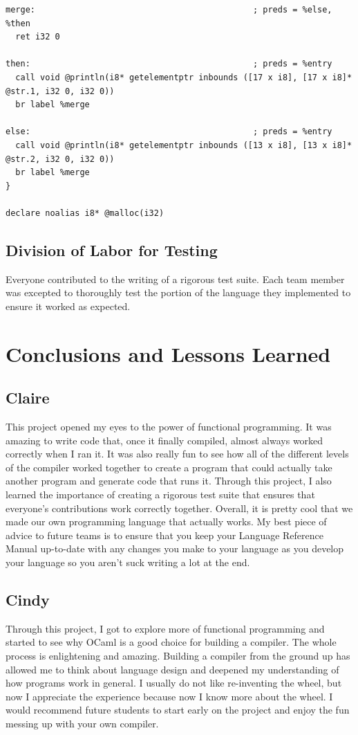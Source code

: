 \documentclass[12pt]{article}
\begin{document}
\begin{mdframed}[hidealllines=true,backgroundcolor=green!10]
\begin{lstlisting}
merge:                                            ; preds = %else, %then
  ret i32 0

then:                                             ; preds = %entry
  call void @println(i8* getelementptr inbounds ([17 x i8], [17 x i8]* @str.1, i32 0, i32 0))
  br label %merge

else:                                             ; preds = %entry
  call void @println(i8* getelementptr inbounds ([13 x i8], [13 x i8]* @str.2, i32 0, i32 0))
  br label %merge
}

declare noalias i8* @malloc(i32)
\end{lstlisting}
\end{mdframed}

\subsection{Division of Labor for Testing}
Everyone contributed to the writing of a rigorous test suite. Each team member was excepted to thoroughly test the portion of the language they implemented to ensure it worked as expected.

\section{Conclusions and Lessons Learned}
\subsection{Claire}
This project opened my eyes to the power of functional programming. It was amazing to write code that, once it finally compiled, almost always worked correctly when I ran it. It was also really fun to see how all of the different levels of the compiler worked together to create a program that could actually take another program and generate code that runs it. Through this project, I also learned the importance of creating a rigorous test suite that ensures that everyone's contributions work correctly together. Overall, it is pretty cool that we made our own programming language that actually works. My best piece of advice to future teams is to ensure that you keep your Language Reference Manual up-to-date with any changes you make to your language as you develop your language so you aren't suck writing a lot at the end. 

\subsection{Cindy}
Through this project, I got to explore more of functional programming and started to see why OCaml is a good choice for building a compiler. The whole process is enlightening and amazing. Building a compiler from the ground up has allowed me to think about language design and deepened my understanding of how programs work in general. I usually do not like re-inventing the wheel, but now I appreciate the experience because now I know more about the wheel. I would recommend future students to start early on the project and enjoy the fun messing up with your own compiler.
\end{document}
